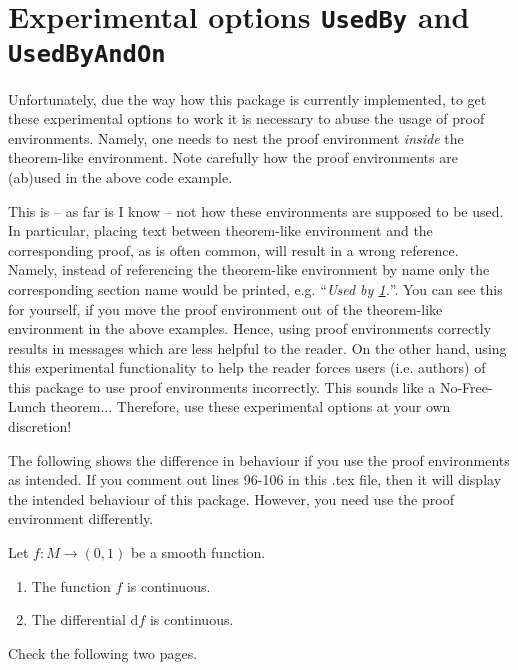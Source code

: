 \documentclass{article}
\begin{document}



\section{Experimental options \texttt{UsedBy} and \texttt{UsedByAndOn}}
\label{sec:UsedByAndOn}
Unfortunately, due the way how this package is currently implemented, to get these
experimental options to work it is necessary to abuse the usage of proof environments.
Namely, one needs to nest the proof environment \emph{inside} the theorem-like environment.
Note carefully how the proof environments are (ab)used in the above code example.

This is -- as far is I know -- not how these environments are supposed to be used.
In particular, placing text between theorem-like environment and the corresponding proof,
as is often common, will result in a wrong reference. Namely, instead of referencing the
theorem-like environment by name only the corresponding section name would be printed, e.g.
``\emph{Used by \cref{sec:UsedByAndOn}.}''.
You can see this for yourself, if you move the proof environment out of the theorem-like
environment in the above examples.
Hence, using proof environments correctly results in messages which are less helpful to the reader.
On the other hand, using this experimental functionality to help the reader forces users (i.e. authors)
of this package to use proof environments incorrectly.
This sounds like a No-Free-Lunch theorem...
Therefore, use these experimental options at your own discretion!

The following shows the difference in behaviour if you use the proof environments as intended.
If you comment out lines 96-106 in this .tex file, then it will display the intended behaviour of this package. However, you need use the proof environment differently.

\begin{theorem}\label{lemma:SmoothFunction}
Let $f\colon M\to(0,1)$ be a smooth function.
\begin{enumerate}
    \item   \label{thm:Item1}
    	The function $f$ is continuous.
    \item   \label{thm:Item2}
    	The differential $\mathrm{d}f$ is continuous.
\end{enumerate}
\end{theorem}

Check the following two pages.
\end{document}
